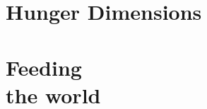 \documentclass[print,Draft]{faosyb}
\begin{document}
\EndPartIntro



\section{}
\begin{tablepages}
\small
  
\clearpage

\end{tablepages}


\part{Hunger Dimensions}
\lipsum

\KeyResources


\EndPartIntro



\begin{tablepages}
\section{}
\small
  
\clearpage

\end{tablepages}


\part[Feeding the world]{Feeding\\ the world}
\lipsum

\KeyResources


\EndPartIntro



\begin{tablepages}
\section{}
\small
  
\clearpage

\end{tablepages}
\end{document}
